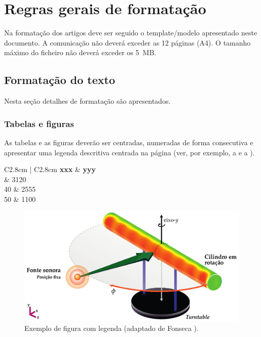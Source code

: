 \documentclass[11pt, a4paper, twoside]{article}
\begin{document}
\section{Regras gerais de formatação}

Na formatação dos artigos deve ser seguido o template/modelo apresentado neste documento. 
A comunicação não deverá exceder as 12 páginas (A4). O tamanho máximo do ficheiro não deverá exceder os 5~MB.


\subsection{Formatação do texto}

Nesta seção detalhes de formatação são apresentados.


\subsubsection{Tabelas e figuras}

As tabelas e as figuras deverão ser centradas, numeradas de forma consecutiva e apresentar uma legenda descritiva centrada na página (ver, por exemplo, a  e a ).

\begin{table}[H]
  \centering 
  \caption{Exemplo de tabela xxx / yyy.}
	\fontsize{11}{12}\selectfont 
    \begin{tabular}{C{2.8cm} | C{2.8cm}}
    \toprule
    \textbf{ xxx } & \textbf{yyy} \\
	   & 3120\\
		 40	& 2555\\
		50 & 1100\\
    \bottomrule
    \end{tabular}
    \label{tab.exemplo}%
\end{table}%


\begin{figure}[H]
	\centering
	\includegraphics[width=0.75\linewidth]{Figuras/Measurement-Scheme-Fonseca-2013.pdf}%
	\caption{Exemplo de figura com legenda (adaptado de Fonseca \cite{Fonseca-2013}).}%
	\label{fig:beamforming}%
\end{figure}
\end{document}
